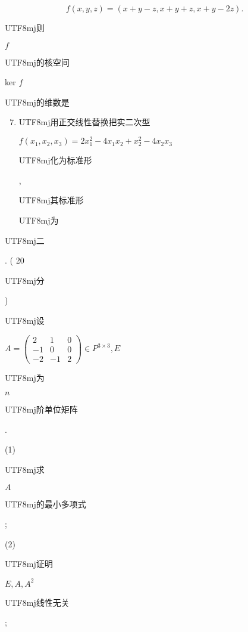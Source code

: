 \documentclass[10pt]{article}
\begin{document}
$$
f(x, y, z)=(x+y-z, x+y+z, x+y-2 z) .
$$
\begin{CJK}{UTF8}{mj}则\end{CJK} $f$ \begin{CJK}{UTF8}{mj}的核空间\end{CJK} ker $f$ \begin{CJK}{UTF8}{mj}的维数是\end{CJK}

\begin{enumerate}
  \setcounter{enumi}{6}
  \item \begin{CJK}{UTF8}{mj}用正交线性替换把实二次型\end{CJK} $f\left(x_{1}, x_{2}, x_{3}\right)=2 x_{1}^{2}-4 x_{1} x_{2}+x_{2}^{2}-4 x_{2} x_{3}$ \begin{CJK}{UTF8}{mj}化为标准形\end{CJK}, \begin{CJK}{UTF8}{mj}其标准形\end{CJK} \begin{CJK}{UTF8}{mj}为\end{CJK}
\end{enumerate}
\begin{CJK}{UTF8}{mj}二\end{CJK}. ( 20 \begin{CJK}{UTF8}{mj}分\end{CJK}) \begin{CJK}{UTF8}{mj}设\end{CJK} $A=\left(\begin{array}{ccc}2 & 1 & 0 \\ -1 & 0 & 0 \\ -2 & -1 & 2\end{array}\right) \in P^{3 \times 3}, E$ \begin{CJK}{UTF8}{mj}为\end{CJK} $n$ \begin{CJK}{UTF8}{mj}阶单位矩阵\end{CJK}.

(1) \begin{CJK}{UTF8}{mj}求\end{CJK} $A$ \begin{CJK}{UTF8}{mj}的最小多项式\end{CJK};

(2) \begin{CJK}{UTF8}{mj}证明\end{CJK} $E, A, A^{2}$ \begin{CJK}{UTF8}{mj}线性无关\end{CJK};
\end{document}
